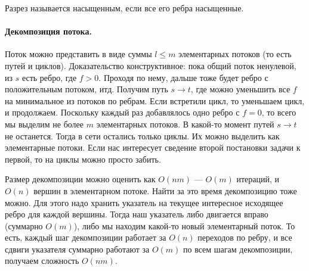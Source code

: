 \documentclass[12pt]{article}
\begin{document}
Разрез называется насыщенным, если все его ребра насыщенные.
\paragraph{Декомпозиция потока.} Поток можно представить в виде суммы $l \le m$ элементарных потоков (то есть путей и циклов). Доказательство конструктивное: пока общий поток ненулевой, из $s$ есть ребро, где $f > 0$. Проходя по нему, дальше тоже будет ребро с положительным потоком, итд. Получим путь $s \rightarrow t$, где можно уменьшить все $f$ на минимальное из потоков по ребрам. Если встретили цикл, то уменьшаем цикл, и продолжаем. Поскольку каждый раз добавлялось одно ребро с $f = 0$, то всего мы выделим не более $m$ элементарных потоков. В какой-то момент путей $s \rightarrow t$ не останется. Тогда в сети остались только циклы. Их можно выделить как элементарные потоки. Если нас интересует сведение второй постановки задачи к первой, то на циклы можно просто забить.

Размер декомпозиции можно оценить как $O(nm)$ --- $O(m)$ итераций, и $O(n)$ вершин в элементарном потоке. Найти за это время декомпозицию тоже можно. Для этого надо хранить указатель на текущее интересное исходящее ребро для каждой вершины. Тогда наш указатель либо двигается вправо (суммарно $O(m)$), либо мы находим какой-то новый элементарный поток. То есть, каждый шаг декомпозиции работает за $O(n)$ переходов по ребру, и все сдвиги указателя суммарно работают за $O(m)$ по всем шагам декомпозиции, получаем сложность $O(nm)$.
\end{document}
